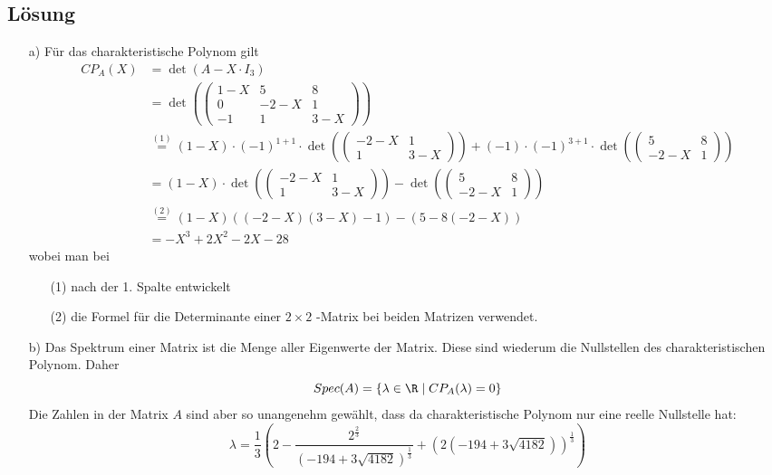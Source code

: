 \subsection*{L\"osung}
\begin{itemize}
\item[a)] Für das charakteristische Polynom gilt 
\begin{align*}
CP_A(X)&=\det(A-X\cdot I_3)\\
&=\det(\begin{pmatrix}
		1-X	&5&8	\\
		0	&-2-X	&1	\\
		-1	&1	&3-X
	\end{pmatrix})\\
&\stackrel{(1)}{=} (1-X)\cdot(-1)^{1+1}\cdot \det(\begin{pmatrix}
		-2-X	&1	\\
		1	&3-X
	\end{pmatrix})+(-1)\cdot(-1)^{3+1}\cdot \det(\begin{pmatrix}
		5	&8	\\
		-2-X	&1
	\end{pmatrix})\\
&= (1-X)\cdot \det(\begin{pmatrix}
		-2-X	&1	\\
		1	&3-X
	\end{pmatrix})-\det(\begin{pmatrix}
		5	&8	\\
		-2-X	&1
	\end{pmatrix})\\
&\stackrel{(2)}{=}(1-X)((-2-X)(3-X)-1)-(5-8(-2-X))\\
&=
-X^3 + 2 X^2 - 2 X - 28
\end{align*}
wobei man bei
\begin{itemize}
\item[(1)] nach der 1. Spalte entwickelt
\item[(2)] die Formel für die Determinante einer $2\times2$ -Matrix bei beiden Matrizen verwendet.
\end{itemize}
\item[b)] Das Spektrum einer Matrix ist die Menge aller Eigenwerte der Matrix. Diese sind wiederum die Nullstellen des charakteristischen Polynom. Daher
$$
Spec(A)=\{\lambda \in \R \mid CP_A(\lambda)=0\}
$$
Die Zahlen in der Matrix $A$ sind aber so unangenehm gewählt, dass da charakteristische Polynom nur eine reelle Nullstelle hat:
$$
\lambda=\frac{1}{3} \left(2 - \frac{2^{\frac{2}{3}}}{(-194 + 3 \sqrt{4182})^{\frac{1}{3}}} + \left(2 (-194 + 3 \sqrt{4182})\right)^{\frac{1}{3}}\right)
$$
\end{itemize}



